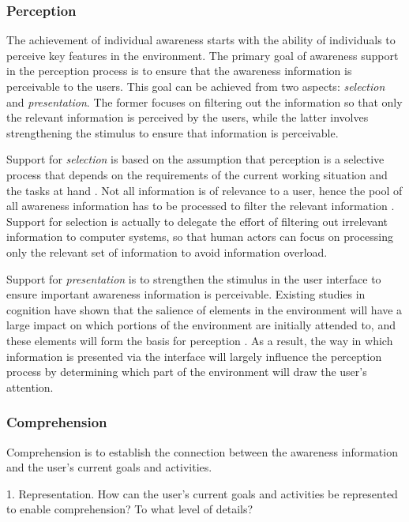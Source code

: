 \subsubsection*{Perception} %
\label{ssub:perception}
The achievement of individual awareness starts with the ability of individuals to perceive key features in the environment. The primary goal of awareness support in the perception process is to ensure that the awareness information is perceivable to the users. This goal can be achieved from two aspects: \emph{selection} and \emph{presentation}. The former focuses on filtering out the information so that only the relevant information is perceived by the users, while the latter involves strengthening the stimulus to ensure that information is perceivable.

Support for \emph{selection} is based on the assumption that perception is a selective process that depends on the requirements of the current working situation and the tasks at hand \cite{Endsley1995}. Not all information is of relevance to a user, hence the pool of all awareness information has to be processed to filter the relevant information \cite{Berlage1999}. Support for selection is actually to delegate the effort of filtering out irrelevant information to computer systems, so that human actors can focus on processing only the relevant set of information to avoid information overload.

Support for \emph{presentation} is to strengthen the stimulus in the user interface to ensure important awareness information is perceivable. Existing studies in cognition have shown that the salience of elements in the environment will have a large impact on which portions of the environment are initially attended to, and these elements will form the basis for perception \cite{Hegarty2011}. As a result, the way in which information is presented via the interface will largely influence the perception process by determining which part of the environment will draw the user's attention.

\subsubsection*{Comprehension} %
\label{ssub:comprehension}
Comprehension is to establish the connection between the awareness information and the user's current goals and activities. \cite{oulasvirta2007a}

1. Representation. How can the user's current goals and activities be represented to enable comprehension? To what level of details?

